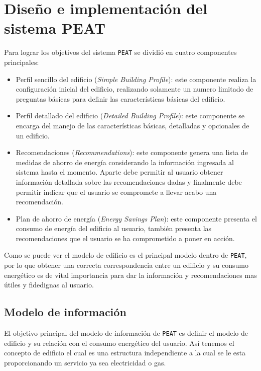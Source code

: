 \chapter{Diseño e implementación del sistema PEAT}

Para lograr los objetivos del sistema \texttt{PEAT} se dividió en cuatro
componentes principales:

\begin{itemize}
\item Perfil sencillo del edificio (\textit{Simple Building Profile}): este
  componente realiza la configuración inicial del edificio, realizando solamente
  un numero limitado de preguntas básicas para definir las características básicas
  del edificio.
\item Perfil detallado del edificio (\textit{Detailed Building Profile}):
  este componente se encarga del manejo de las características básicas, detalladas y
  opcionales de un edificio.
\item Recomendaciones (\textit{Recommendations}): este componente genera una lista
  de medidas de ahorro de energía considerando la información ingresada al sistema
  hasta el momento. Aparte debe permitir al usuario obtener información detallada
  sobre las recomendaciones dadas y finalmente debe permitir indicar que el usuario
  se compromete a llevar acabo una recomendación.
\item Plan de ahorro de energía (\textit{Energy Savings Plan}): este componente
  presenta el consumo de energía del edificio al usuario, también presenta las
  recomendaciones que el usuario se ha comprometido a poner en acción.
\end{itemize}

Como se puede ver el modelo de edificio es el principal modelo dentro de
\texttt{PEAT}, por lo que obtener una correcta correspondencia entre un
edificio y su consumo energético es de vital importancia para dar la
información y recomendaciones mas útiles y fidedignas al usuario.

\section{Modelo de información}

El objetivo principal del modelo de información de \texttt{PEAT} es definir el
modelo de edificio y su relación con el consumo energético del usuario. Así
tenemos el concepto de edificio el cual es una estructura independiente a la
cual se le esta proporcionando un servicio ya sea electricidad o gas.

